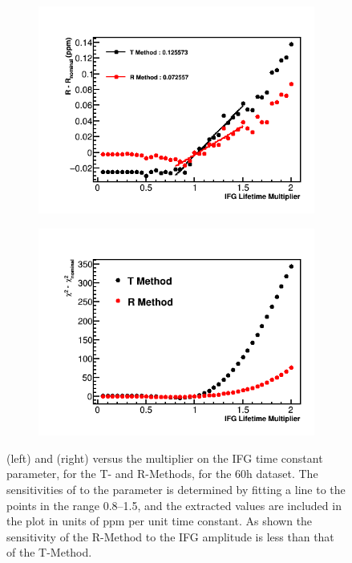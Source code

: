 \begin{figure}[h]
\label{fig:IFGAmpscan}
\end{figure}



\begin{figure}[h]
\centering
    \begin{subfigure}[t]{0.45\textwidth}
        \centering
        \includegraphics[width=\textwidth]{IFG_Lifetime_Compare_R}
    \end{subfigure}%
    \hspace{1cm}
    \begin{subfigure}[t]{0.45\textwidth}
        \centering
        \includegraphics[width=\textwidth]{IFG_Lifetime_Compare_Chisq}
    \end{subfigure}
\caption[]{\R (left) and \chisq (right) versus the multiplier on the IFG time constant parameter, for the T- and R-Methods, for the 60h dataset. The sensitivities of \R to the parameter is determined by fitting a line to the points in the range 0.8--1.5, and the extracted values are included in the plot in units of ppm per unit time constant. As shown the sensitivity of the R-Method to the IFG amplitude is less than that of the T-Method.}
\label{fig:IFGtauscan}
\end{figure}


